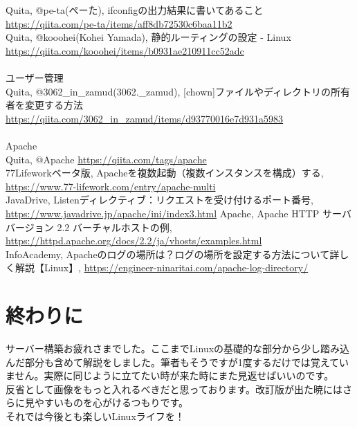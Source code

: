 \documentclass[a4paper, 11pt, dvipdfmx]{jsarticle}
\begin{document}
Quita, @pe-ta(ペーた), ifconfigの出力結果に書いてあること \url{https://qiita.com/pe-ta/items/aff8db72530c6baa11b2}\\
Quita, @kooohei(Kohei Yamada), 静的ルーティングの設定 - Linux \url{https://qiita.com/kooohei/items/b0931ae210911cc52adc}\\
\\
ユーザー管理\\
Quita, @3062\_in\_zamud(3062.\_zamud), [chown]ファイルやディレクトリの所有者を変更する方法 \url{https://qiita.com/3062_in_zamud/items/d93770016e7d931a5983}\\
\\
Apache\\
Quita, @Apache \url{https://qiita.com/tags/apache}\\
77Lifeworkベータ版, Apacheを複数起動（複数インスタンスを構成）する, \url{https://www.77-lifework.com/entry/apache-multi}\\
JavaDrive, Listenディレクティブ：リクエストを受け付けるポート番号, \url{https://www.javadrive.jp/apache/ini/index3.html}
Apache, Apache HTTP サーバ バージョン 2.2 バーチャルホストの例, \url{https://httpd.apache.org/docs/2.2/ja/vhosts/examples.html}\\
InfoAcademy, Apacheのログの場所は？ログの場所を設定する方法について詳しく解説【Linux】, \url{https://engineer-ninaritai.com/apache-log-directory/}\\









\newpage
\section{終わりに}
サーバー構築お疲れさまでした。ここまでLinuxの基礎的な部分から少し踏み込んだ部分も含めて解説をしました。筆者もそうですが1度するだけでは覚えていません。実際に同じように立てたい時が来た時にまた見返せばいいのです。\\

反省として画像をもっと入れるべきだと思っております。改訂版が出た暁にはさらに見やすいものを心がけるつもりです。\\
それでは今後とも楽しいLinuxライフを！
\end{document}
